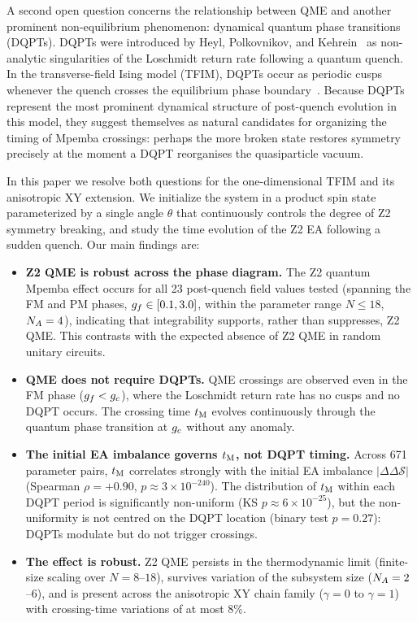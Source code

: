 A second open question concerns the relationship between QME and another prominent
non-equilibrium phenomenon: dynamical quantum phase transitions (DQPTs).
DQPTs were introduced by Heyl, Polkovnikov, and Kehrein~\cite{Heyl2013} as non-analytic
singularities of the Loschmidt return rate following a quantum quench.
In the transverse-field Ising model (TFIM), DQPTs occur as periodic cusps whenever
the quench crosses the equilibrium phase boundary~\cite{Heyl2013,Heyl2018}.
Because DQPTs represent the most prominent dynamical structure of post-quench evolution
in this model, they suggest themselves as natural candidates for organizing
the timing of Mpemba crossings: perhaps the more broken state restores symmetry
precisely at the moment a DQPT reorganises the quasiparticle vacuum.

In this paper we resolve both questions for the one-dimensional TFIM and its
anisotropic XY extension.
We initialize the system in a product spin state parameterized by a single angle
$\theta$ that continuously controls the degree of Z2 symmetry breaking, and
study the time evolution of the Z2 EA following a sudden quench.
Our main findings are:
\begin{itemize}
  \item \textbf{Z2 QME is robust across the phase diagram.}
    The Z2 quantum Mpemba effect occurs for all 23 post-quench field values tested
    (spanning the FM and PM phases, $g_f \in [0.1, 3.0]$, within the parameter
    range $N \leq 18$, $N_A = 4$), indicating that integrability supports,
    rather than suppresses, Z2 QME.
    This contrasts with the expected absence of Z2 QME in random unitary circuits.

  \item \textbf{QME does not require DQPTs.}
    QME crossings are observed even in the FM phase ($g_f < g_c$), where the
    Loschmidt return rate has no cusps and no DQPT occurs.
    The crossing time $t_{\rm M}$ evolves continuously through the quantum phase transition
    at $g_c$ without any anomaly.

  \item \textbf{The initial EA imbalance governs $t_{\rm M}$, not DQPT timing.}
    Across 671 parameter pairs, $t_{\rm M}$ correlates strongly with the initial EA
    imbalance $|\Delta\Delta\mathcal{S}|$ (Spearman $\rho = +0.90$,
    $p \approx 3 \times 10^{-240}$).
    The distribution of $t_{\rm M}$ within each DQPT period is significantly non-uniform
    (KS $p \approx 6 \times 10^{-25}$), but the non-uniformity is not centred
    on the DQPT location (binary test $p = 0.27$): DQPTs modulate but do not
    trigger crossings.

  \item \textbf{The effect is robust.}
    Z2 QME persists in the thermodynamic limit (finite-size scaling over $N = 8$--$18$),
    survives variation of the subsystem size ($N_A = 2$--$6$), and is present
    across the anisotropic XY chain family ($\gamma = 0$ to $\gamma = 1$) with
    crossing-time variations of at most $8\%$.
\end{itemize}

